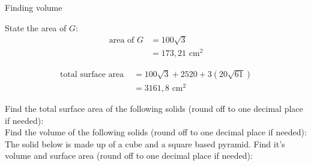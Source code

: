 \begin{wex}{Finding volume}
{State the area of $G$:
\begin{align*}
\mbox{area of }G &= 100\sqrt{3}\\
&=173,21\mbox{ cm}^2
\end{align*}

\begin{align*}
\mbox{total surface area } &= 100\sqrt{3} + 2520 + 3(20\sqrt{61})\\
&=3161,8\mbox{ cm}^2
\end{align*}
}
\end{wex}

\begin{exercises}{}
 {
Find the total surface area of the following solids (round off to one decimal place if needed):
\\
Find the volume of the following solids (round off to one decimal place if needed):
\\
The solid below is made up of a cube and a square based pyramid. Find it's volume and surface area (round off to one decimal place if needed):
}
\end{exercises}
